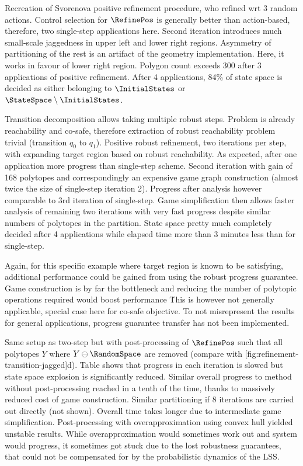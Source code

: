     Recreation of Svorenova positive refinement procedure, who refined wrt 3 random actions.
    Control selection for $\RefinePos$ is generally better than action-based, therefore, two single-step applications here.
    Second iteration introduces much small-scale jaggedness in upper left and lower right regions.
    Asymmetry of partitioning of the rest is an artifact of the geometry implementation.
    Here, it works in favour of lower right region.
    Polygon count exceeds 300 after 3 applications of positive refinement.
    After 4 applications, 84\% of state space is decided as either belonging to $\InitialStates$ or $\StateSpace \setminus \InitialStates$.

    Transition decomposition allows taking multiple robust steps.
    Problem is already reachability and co-safe, therefore extraction of robust reachability problem trivial (transition $q_0$ to $q_1$).
    Positive robust refinement, two iterations per step, with expanding target region based on robust reachability.
    As expected, after one application more progress than single-step scheme.
    Second iteration with gain of 168 polytopes and correspondingly an expensive game graph construction (almost twice the size of single-step iteration 2).
    Progress after analysis however comparable to 3rd iteration of single-step.
    Game simplification then allows faster analysis of remaining two iterations with very fast progress despite similar numbers of polytopes in the partition.
    State space pretty much completely decided after 4 applications while elapsed time more than 3 minutes less than for single-step.

    Again, for this specific example where target region is known to be satisfying, additional performance could be gained from using the robust progress guarantee.
    Game construction is by far the bottleneck and reducing the number of polytopic operations required would boost performance \.
    This is however not generally applicable, special case here for co-safe objective.
    To not misrepresent the results for general applications, progress guarantee transfer has not been implemented.

    Same setup as two-step but with post-processing of $\RefinePos$ such that all polytopes $Y$ where $Y \ominus \RandomSpace$ are removed (compare with [fig:refinement-transition-jagged]d).
    Table \in[TODO] shows that progress in each iteration is slowed but state space explosion is significantly reduced.
    Similar overall progress to method without post-processing reached in a tenth of the time, thanks to massively reduced cost of game construction.
    Similar partitioning if 8 iterations are carried out directly (not shown).
    Overall time takes longer due to intermediate game simplification.
    Post-processing with overapproximation using convex hull yielded unstable results.
    While overapproximation would sometimes work out and system would progress, it sometimes got stuck due to the lost robustness guarantees, that could not be compensated for by the probabilistic dynamics of the LSS.

